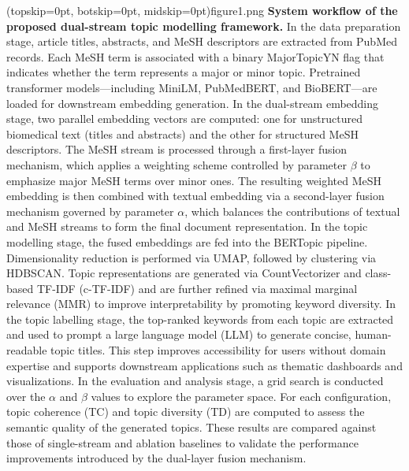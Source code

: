\documentclass{ieeeaccess}
\begin{document}
\Figure[t!](topskip=0pt, botskip=0pt, midskip=0pt){figure1.png}
{ \textbf{System workflow of the proposed dual-stream topic modelling framework.}\label{fig1}}
In the data preparation stage, article titles, abstracts, and MeSH descriptors are extracted from PubMed records. Each MeSH term is associated with a binary MajorTopicYN flag that indicates whether the term represents a major or minor topic. Pretrained transformer models—including MiniLM, PubMedBERT, and BioBERT—are loaded for downstream embedding generation.
In the dual-stream embedding stage, two parallel embedding vectors are computed: one for unstructured biomedical text (titles and abstracts) and the other for structured MeSH descriptors. The MeSH stream is processed through a first-layer fusion mechanism, which applies a weighting scheme controlled by parameter $\beta$ to emphasize major MeSH terms over minor ones. The resulting weighted MeSH embedding is then combined with textual embedding via a second-layer fusion mechanism governed by parameter $\alpha$, which balances the contributions of textual and MeSH streams to form the final document representation.
In the topic modelling stage, the fused embeddings are fed into the BERTopic pipeline. Dimensionality reduction is performed via UMAP, followed by clustering via HDBSCAN. Topic representations are generated via CountVectorizer and class-based TF-IDF (c-TF-IDF) and are further refined via maximal marginal relevance (MMR) to improve interpretability by promoting keyword diversity.
In the topic labelling stage, the top-ranked keywords from each topic are extracted and used to prompt a large language model (LLM) to generate concise, human-readable topic titles. This step improves accessibility for users without domain expertise and supports downstream applications such as thematic dashboards and visualizations.
In the evaluation and analysis stage, a grid search is conducted over the $\alpha$ and $\beta$ values to explore the parameter space. For each configuration, topic coherence (TC) and topic diversity (TD) are computed to assess the semantic quality of the generated topics. These results are compared against those of single-stream and ablation baselines to validate the performance improvements introduced by the dual-layer fusion mechanism.
\end{document}
